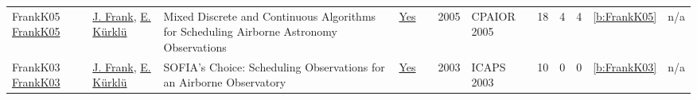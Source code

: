 {\begin{longtable}{>{\raggedright\arraybackslash}p{3cm}>{\raggedright\arraybackslash}p{6cm}>{\raggedright\arraybackslash}p{6.5cm}rrrp{2.5cm}rrrrr}
FrankK05 \href{https://doi.org/10.1007/11493853_15}{FrankK05} & \hyperref[auth:a382]{J. Frank}, \hyperref[auth:a383]{E. K{\"{u}}rkl{\"{u}}} & Mixed Discrete and Continuous Algorithms for Scheduling Airborne Astronomy Observations & \href{../works/FrankK05.pdf}{Yes} & \cite{FrankK05} & 2005 & CPAIOR 2005 & 18 & 4 & 4 & \ref{b:FrankK05} & n/a\\
FrankK03 \href{http://www.aaai.org/Library/ICAPS/2003/icaps03-023.php}{FrankK03} & \hyperref[auth:a382]{J. Frank}, \hyperref[auth:a383]{E. K{\"{u}}rkl{\"{u}}} & SOFIA's Choice: Scheduling Observations for an Airborne Observatory & \href{../works/FrankK03.pdf}{Yes} & \cite{FrankK03} & 2003 & ICAPS 2003 & 10 & 0 & 0 & \ref{b:FrankK03} & n/a\\
\end{longtable}
}

\clearpage
